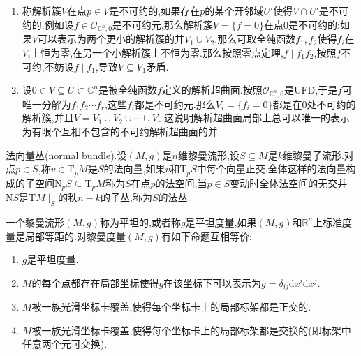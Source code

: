 \begin{enumerate}
\begin{proof}
		最后按照带余除法,记$h=fg+r$,其中$r\in\mathscr{O}_{\mathbb{C}^{n-1}}[w]$,并且$r$的关于$w$的次数严格小于$k$.但是在$\{\gamma(z)=0\}$以外的点$z$总有$f(z,w)$关于$w$至少有$k$个不同根,导致$h$也至少有这$k$个不同根,但是$r$关于$w$的次数严格小于$k$,迫使$r(z,w)=0$对$z\not\in\{\gamma(z)=0\}$成立.导致$r\equiv0$【】,于是$h=fg$.
	\end{proof}
	\item 称解析簇$V$在点$p\in V$是不可约的,如果存在$p$的某个开邻域$U'$使得$V\cap U'$是不可约的.例如设$f\in\mathscr{O}_{\mathbb{C}^n,0}$是不可约元,那么解析簇$V=\{f=0\}$在点$0$是不可约的:如果$V$可以表示为两个更小的解析簇的并$V_1\cup V_2$,那么可取全纯函数$f_1,f_2$使得$f_i$在$V_i$上恒为零,在另一个小解析簇上不恒为零.那么按照零点定理,$f\mid f_1f_2$,按照$f$不可约,不妨设$f\mid f_1$,导致$V\subseteq V_1$矛盾.
	\item 设$0\in V\subseteq U\subset\mathbb{C}^n$是被全纯函数$f$定义的解析超曲面.按照$\mathscr{O}_{\mathbb{C}^n,0}$是UFD,于是$f$可唯一分解为$f_1f_2\cdots f_r$,这些$f_i$都是不可约元.那么$V_i=\{f_i=0\}$都是在0处不可约的解析簇,并且$V=V_1\cup V_2\cup\cdots\cup V_r$.这说明解析超曲面局部上总可以唯一的表示为有限个互相不包含的不可约解析超曲面的并.
\end{enumerate}

\item 法向量丛(normal bundle).设$(M,g)$是$n$维黎曼流形,设$S\subseteq M$是$k$维黎曼子流形.对点$p\in S$,称$v\in\mathrm{T}_pM$是$S$的法向量,如果$v$和$\mathrm{T}_pS$中每个向量正交.全体这样的法向量构成的子空间$\mathrm{N}_pS\subseteq\mathrm{T}_pM$称为$S$在点$p$的法空间,当$p\in S$变动时全体法空间的无交并$\mathrm{N}S$是$\mathrm{T}M\mid_S$的秩$n-k$的子丛,称为$S$的法丛.

\item 一个黎曼流形$(M,g)$称为平坦的,或者称$g$是平坦度量,如果$(M,g)$和$\mathbb{R}^n$上标准度量是局部等距的.对黎曼度量$(M,g)$有如下命题互相等价:
\begin{enumerate}
	\item $g$是平坦度量.
	\item $M$的每个点都存在局部坐标使得$g$在该坐标下可以表示为$g=\delta_{ij}\mathrm{d}x^i\mathrm{d}x^j$.
	\item $M$被一族光滑坐标卡覆盖,使得每个坐标卡上的局部标架都是正交的.
	\item $M$被一族光滑坐标卡覆盖,使得每个坐标卡上的局部标架都是交换的(即标架中任意两个元可交换).
\end{enumerate}

